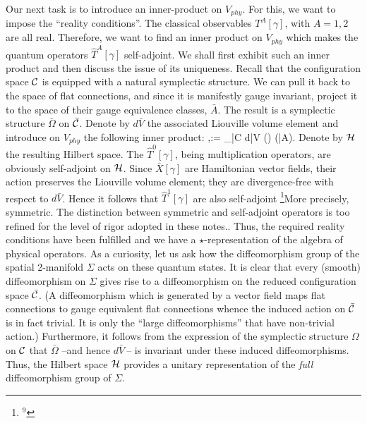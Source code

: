 Our next task is to introduce an inner-product on $V_{phy}$. For this, we
want to impose the ``reality conditions''. The classical observables
$T^A[\gamma ]$, with $A=1,2$ are all real. Therefore, we want to find an
inner product on
$V_{phy}$ which makes the quantum operators ${\hat T}^A[\gamma ]$ self-adjoint.
We shall first exhibit such an inner product and then discuss the issue of its
uniqueness. Recall that the configuration space ${\cal C}$ is equipped with a
natural symplectic structure. We can pull it back to the space of flat
connections, and since it is manifestly gauge invariant, project it to the
space of their gauge equivalence classes, $\bar{A}$. The result is a symplectic
structure $\bar\Omega$ on $\bar{\cal C}$. Denote by $d\bar{V}$ the associated
Liouville volume element and introduce on $V_{phy}$ the following inner
product:
\bneq
\langle\Psi\>,\>\Phi\rangle := \lint_{\bar{\cal C}} d\bar{V}\>
\>() \Phi (\bar{A})\>\>.
Denote by ${\cal H}$ the resulting Hilbert space. The ${\hat T}^0[\gamma ]$,
being multiplication operators, are obviously self-adjoint on ${\cal H}$.
Since $\bar{X}[\gamma ]$ are Hamiltonian vector fields, their action preserves
the Liouville volume element; they are divergence-free with respect to
$d\bar{V}$. Hence it follows that ${\hat T}^1[\gamma ]$ are also self-adjoint
\footnote{$^9$}{More precisely, symmetric. The distinction between symmetric
and self-adjoint operators is too refined for the level of rigor adopted in
these notes.}. Thus, the required reality conditions have been fulfilled and
we have a $\star$-representation of the algebra of physical operators. As a
curiosity, let us ask how the diffeomorphism group of the spatial 2-manifold
$\Sigma$ acts on these quantum states. It is clear that every (smooth)
diffeomorphism on $\Sigma$ gives rise to a diffeomorphism on the reduced
configuration space $\bar{\cal C}$. (A diffeomorphism which is generated by a
vector field maps flat connections to gauge equivalent flat connections whence
the induced action on $\bar{\cal C}$ is in fact trivial. It is only the
``large diffeomorphisms'' that have non-trivial action.) Furthermore, it
follows from the expression of the symplectic structure $\Omega$ on ${\cal C}$
that $\bar\Omega$ --and hence $d\bar{V}\>$-- is invariant under these induced
diffeomorphisms. Thus, the Hilbert space ${\cal H}$ provides a unitary
representation of the {\it full} diffeomorphism group of $\Sigma$.

